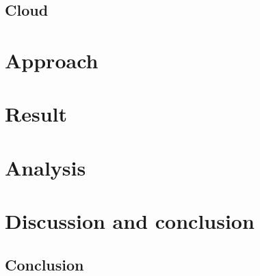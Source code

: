 \subsection{Cloud}

\section{Approach}

\section{Result}


\section{Analysis}

\section{Discussion and conclusion}

\subsection{Conclusion}
